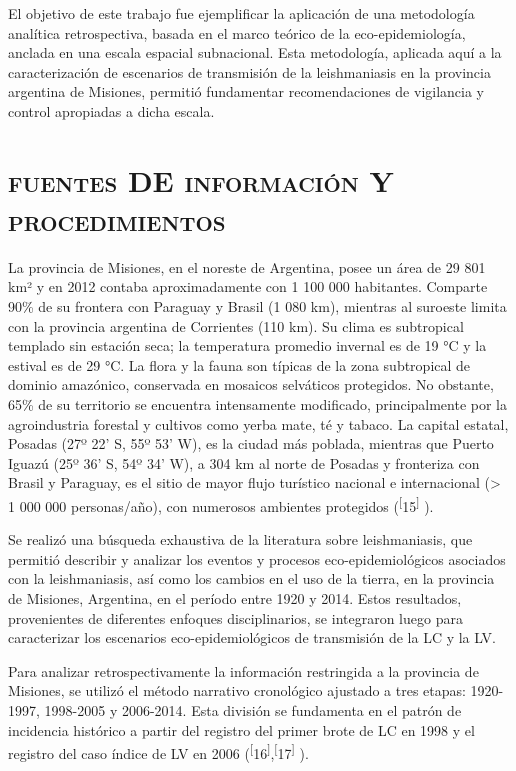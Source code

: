 \documentclass{article}
\begin{document}
El objetivo de este trabajo fue ejemplificar la aplicación de una metodología
analítica retrospectiva, basada en el marco teórico de la eco-epidemiología,
anclada en una escala espacial subnacional. Esta metodología, aplicada aquí a la
caracterización de escenarios de transmisión de la leishmaniasis en la provincia
argentina de Misiones, permitió fundamentar recomendaciones de vigilancia y
control apropiadas a dicha escala.
\section{\textsc{fuentes} DE \textsc{información} Y \textsc{procedimientos}}

La provincia de Misiones, en el noreste de Argentina, posee un área de 29 801
km² y en 2012 contaba aproximadamente con 1 100 000 habitantes. Comparte 90\% de
su frontera con Paraguay y Brasil (1 080 km), mientras al suroeste limita con la
provincia argentina de Corrientes (110 km). Su clima es subtropical templado sin
estación seca; la temperatura promedio invernal es de 19 °C y la estival es de
29 °C. La flora y la fauna son típicas de la zona subtropical de dominio
amazónico, conservada en mosaicos selváticos protegidos. No obstante, 65\% de su
territorio se encuentra intensamente modificado, principalmente por la
agroindustria forestal y cultivos como yerba mate, té y tabaco. La capital
estatal, Posadas (27º 22’ S, 55º 53’ W), es la ciudad más poblada, mientras que
Puerto Iguazú (25º 36’ S, 54º 34’ W), a 304 km al norte de Posadas y fronteriza
con Brasil y Paraguay, es el sitio de mayor flujo turístico nacional e
internacional (> 1 000 000 personas/año), con numerosos ambientes protegidos
(\textsuperscript{[}15\textsuperscript{]}
).

Se realizó una búsqueda exhaustiva de la literatura sobre leishmaniasis, que
permitió describir y analizar los eventos y procesos eco-epidemiológicos
asociados con la leishmaniasis, así como los cambios en el uso de la tierra, en
la provincia de Misiones, Argentina, en el período entre 1920 y 2014. Estos
resultados, provenientes de diferentes enfoques disciplinarios, se integraron
luego para caracterizar los escenarios eco-epidemiológicos de transmisión de la
LC y la LV.

Para analizar retrospectivamente la información restringida a la provincia de
Misiones, se utilizó el método narrativo cronológico ajustado a tres etapas:
1920-1997, 1998-2005 y 2006-2014. Esta división se fundamenta en el patrón de
incidencia histórico a partir del registro del primer brote de LC en 1998 y el
registro del caso índice de LV en 2006 (\textsuperscript{[}16\textsuperscript{]},\textsuperscript{[}17\textsuperscript{]}
).
\end{document}
